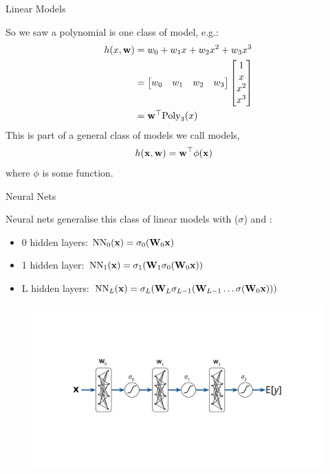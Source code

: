 \documentclass[lualatex, aspectratio=169]{beamer}
\begin{document}
\begin{frame}{Linear Models}

  So we saw a polynomial is one class of model, e.g.:
  \begin{align*}
    h(x, \mathbf{w}) &= w_0 + w_1 x + w_2 x^2 + w_3 x^3 \\
                &= \begin{bmatrix} w_0 & w_1 & w_2 & w_3 \end{bmatrix}
                   \begin{bmatrix} 1 \\ x \\ x^2 \\ x^3 \end{bmatrix} \\
                   &= \mathbf{w}^\top \text{Poly}_3(x)
  \end{align*}
  This is part of a general class of models we call  models,
  \begin{align*}
    h(\mathbf{x}, \mathbf{w}) &= \mathbf{w}^\top \phi(\mathbf{x})
  \end{align*}
  where $\phi$ is some function.

\end{frame}


\begin{frame}{Neural Nets}
  
  Neural nets generalise this class of linear models with  ($\sigma$) and :
  \begin{itemize}
    \item 0 hidden layers: $\text{NN}_{0} ({\mathbf{x}}) = \sigma_0( \mathbf{W}_0\mathbf{x} )$
    \item 1 hidden layer: $\text{NN}_{1} ({\mathbf{x}}) = \sigma_1(\mathbf{W}_1 \sigma_0( \mathbf{W}_0 \mathbf{x} ))$
    \item L hidden layers: $\text{NN}_{L} ({\mathbf{x}}) = \sigma_L(\mathbf{W}_L \sigma_{L-1}(\mathbf{W}_{L-1} \ldots \sigma( \mathbf{W}_0 \mathbf{x} )))$
  \end{itemize}

  \begin{figure}
    \includegraphics[page=1, trim={3cm 4.5cm 3.5cm 4.5cm}, clip, width=0.5\pagewidth]{assets/pictures.pdf}
  \end{figure}
  
\end{frame}
\end{document}
